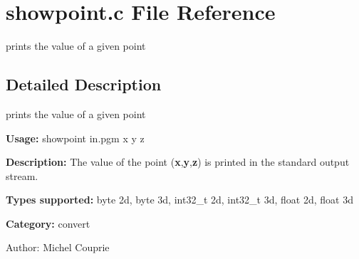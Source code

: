 \section{showpoint.c File Reference}
\label{showpoint_8c}
prints the value of a given point 



\subsection{Detailed Description}
prints the value of a given point 

{\bf Usage:} showpoint in.pgm x y z

{\bf Description:} The value of the point ({\bf x},{\bf y},{\bf z}) is printed in the standard output stream.

{\bf Types supported:} byte 2d, byte 3d, int32\_\-t 2d, int32\_\-t 3d, float 2d, float 3d

{\bf Category:} convert

\begin{Desc}
\item[Author:]Michel Couprie \end{Desc}
